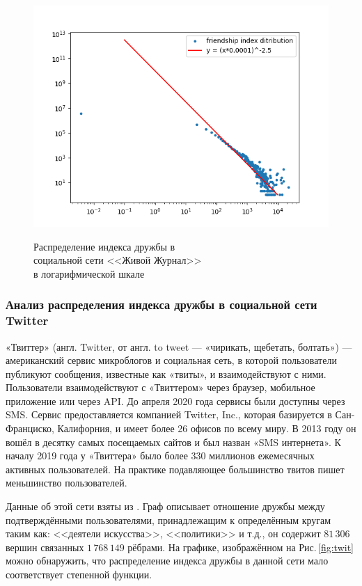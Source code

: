 \documentclass[bachelor, och, diploma]{SCWorks}
\begin{document}
\begin{figure}[!ht]
\centering
\includegraphics[scale=0.7]{diploma_results/static_real_log/soc-LiveJournal1.png}\\
\caption{Распределение индекса дружбы  в\\ социальной сети <<Живой Журнал>>\\ в логарифмической шкале}\label{fig:lj}
\end{figure}

\subsubsection{Анализ распределения индекса дружбы в социальной сети Twitter}
«Твиттер» (англ. Twitter, от англ. to tweet — «чирикать, щебетать, болтать») — американский сервис микроблогов и социальная сеть, в которой пользователи публикуют сообщения, известные как «твиты», и взаимодействуют с ними. Пользователи взаимодействуют с «Твиттером» через браузер, мобильное приложение или через API. До апреля 2020 года сервисы были доступны через SMS. Сервис предоставляется компанией Twitter, Inc., которая базируется в Сан-Франциско, Калифорния, и имеет более 26 офисов по всему миру.  В 2013 году он вошёл в десятку самых посещаемых сайтов и был назван «SMS интернета». К началу 2019 года у «Твиттера» было более 330 миллионов ежемесячных активных пользователей. На практике подавляющее большинство твитов пишет меньшинство пользователей. 

Данные об этой сети взяты из \cite{twit}. Граф описывает отношение дружбы между подтверждёнными пользователями, принадлежащим к определённым кругам таким как: <<деятели искусства>>, <<политики>> и т.д., он содержит $81\,306$ вершин связанных $1\,768\,149$ рёбрами. На графике, изображённом на Рис.\,\ref{fig:twit} можно обнаружить, что распределение индекса дружбы в данной сети мало соответствует степенной функции.
\end{document}
